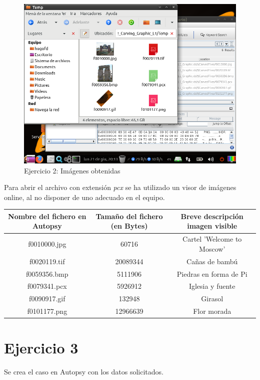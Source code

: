 \documentclass[11pt]{article}
\begin{document}
\begin{figure}[H]
    \caption{Ejercicio 2: Imágenes obtenidas}
    \centering
    \includegraphics[scale=0.7]{e2-6.png}
\end{figure}

Para abrir el archivo con extensión \textit{pcx} se ha utilizado un visor de imágenes online, al no disponer de uno adecuado en el equipo.

\begin{table}[H]
    \centering
    \begin{tabular}{|c|c|c|}
        \hline
        Nombre del fichero en Autopsy & Tamaño del fichero (en Bytes) & Breve descripción imagen visible \\
        \hline\hline
        f0010000.jpg & 60716 & Cartel 'Welcome to Moscow' \\
        \hline
        f0020119.tif & 20089344 & Cañas de bambú \\
        \hline
        f0059356.bmp & 5111906 & Piedras en forma de Pi \\
        \hline
        f0079341.pcx & 5926912 & Iglesia y fuente \\
        \hline
        f0090917.gif & 132948 & Girasol \\
        \hline
        f0101177.png & 12966639 & Flor morada \\
        \hline
    \end{tabular}
\end{table}

\section{Ejercicio 3}
Se crea el caso en Autopsy con los datos solicitados.
\end{document}
